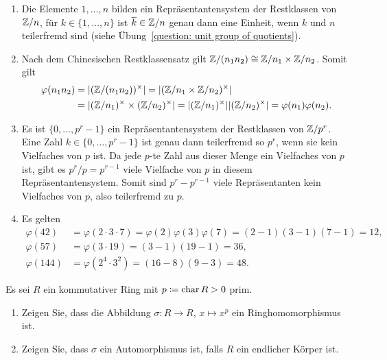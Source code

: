 \begin{solution}
  \begin{enumerate}
    \item
      Die Elemente $1, \dotsc, n$ bilden ein Repräsentantensystem der Restklassen von $\mathbb{Z}/n$, für $k \in \{1, \dotsc, n\}$ ist $\overline{k} \in \mathbb{Z}/n$ genau dann eine Einheit, wenn $k$ und $n$ teilerfremd sind (siehe Übung~\ref{question: unit group of quotients}).
    \item
      Nach dem Chinesischen Restklassensatz gilt $\mathbb{Z}/(n_1 n_2) \cong \mathbb{Z}/n_1 \times \mathbb{Z}/n_2$.
      Somit gilt
      \begin{align*}
            \varphi(n_1 n_2)
        &=  | (\mathbb{Z}/(n_1 n_2))^\times |
         =  | (\mathbb{Z}/n_1 \times \mathbb{Z}/n_2)^\times |
        \\
        &=  | (\mathbb{Z}/n_1)^\times \times (\mathbb{Z}/n_2)^\times |
         =  | (\mathbb{Z}/n_1)^\times | | (\mathbb{Z}/n_2)^\times |
         =  \varphi(n_1) \varphi(n_2).
      \end{align*}
    \item
      Es ist $\{0, \dotsc, p^r - 1\}$ ein Repräsentantensystem der Restklassen von $\mathbb{Z}/p^r$.
      Eine Zahl $k \in \{0, \dotsc, p^r - 1\}$ ist genau dann teilerfremd so $p^r$, wenn sie kein Vielfaches von $p$ ist.
      Da jede $p$-te Zahl aus dieser Menge ein Vielfaches von $p$ ist, gibt es $p^r/p = p^{r-1}$ viele Vielfache von $p$ in diesem Repräsentantensystem.
      Somit sind $p^r - p^{r-1}$ viele Repräsentanten kein Vielfaches von $p$, also teilerfremd zu $p$.
    \item
      Es gelten
      \begin{align*}
            \varphi(42)
        &=  \varphi(2 \cdot 3 \cdot 7)
         =  \varphi(2) \varphi(3) \varphi(7)
         =  (2 - 1)(3 - 1)(7 - 1)
         =  12,
        \\
            \varphi(57)
        &=  \varphi(3 \cdot 19)
         =  (3 - 1)(19 - 1)
         =  36,
        \\
            \varphi(144)
        &=  \varphi(2^4 \cdot 3^2)
         =  (16 - 8) (9 - 3)
         =  48.
      \end{align*}
  \end{enumerate}
\end{solution}


\begin{question}[subtitle = Der Frobeniushomomorphismus]
  Es sei $R$ ein kommutativer Ring mit $p \coloneqq \operatorname{char} R > 0$ prim.
  \begin{enumerate}
    \item
      Zeigen Sie, dass die Abbildung $\sigma \colon R \to R$, $x \mapsto x^p$ ein Ringhomomorphismus ist.
    \item
      Zeigen Sie, dass $\sigma$ ein Automorphismus ist, falls $R$ ein endlicher Körper ist.
  \end{enumerate}
\end{question}


